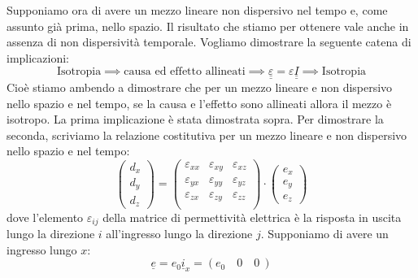 \documentclass{book}
\begin{document}
            \\ \\
            Supponiamo ora di avere un mezzo lineare non dispersivo nel tempo e, come assunto già prima, nello spazio. Il risultato che stiamo per ottenere vale anche in assenza di non dispersività temporale. Vogliamo dimostrare la seguente catena di implicazioni:
            \begin{equation}
                \textrm{Isotropia} \implies \textrm{causa ed effetto allineati} \implies \underline{\underline{\varepsilon}} = \varepsilon \underline{\underline{I}} \implies \textrm{Isotropia}
            \end{equation}
            Cioè stiamo ambendo a dimostrare che per un mezzo lineare e non dispersivo nello spazio e nel tempo, se la causa e l'effetto sono allineati allora il mezzo è isotropo. La prima implicazione è stata dimostrata sopra. Per dimostrare la seconda, scriviamo la relazione costitutiva per un mezzo lineare e non dispersivo nello spazio e nel tempo:
            \begin{equation}
            \label{eqn:matricione1}
                \begin{pmatrix}
                    d_{x} \\
                    d_{y} \\
                    d_{z}
                \end{pmatrix} = 
                \begin{pmatrix}
                    \varepsilon_{xx} & \varepsilon_{xy} & \varepsilon_{xz} \\ 
                    \varepsilon_{yx} & \varepsilon_{yy} & \varepsilon_{yz} \\
                    \varepsilon_{zx} & \varepsilon_{zy} & \varepsilon_{zz} \\
                \end{pmatrix} \cdot 
                \begin{pmatrix}
                    e_{x} \\
                    e_{y} \\
                    e_{z}
                \end{pmatrix}
            \end{equation}
            dove l'elemento $\varepsilon_{ij}$ della matrice di permettività elettrica è la risposta in uscita lungo la direzione $i$ all'ingresso lungo la direzione $j$. Supponiamo di avere un ingresso lungo $x$:
            \begin{equation}
                \underline{e} = e_{0}\underline{i}_{x} = (e_{0} \quad 0 \quad 0\ )
            \end{equation}
\end{document}
